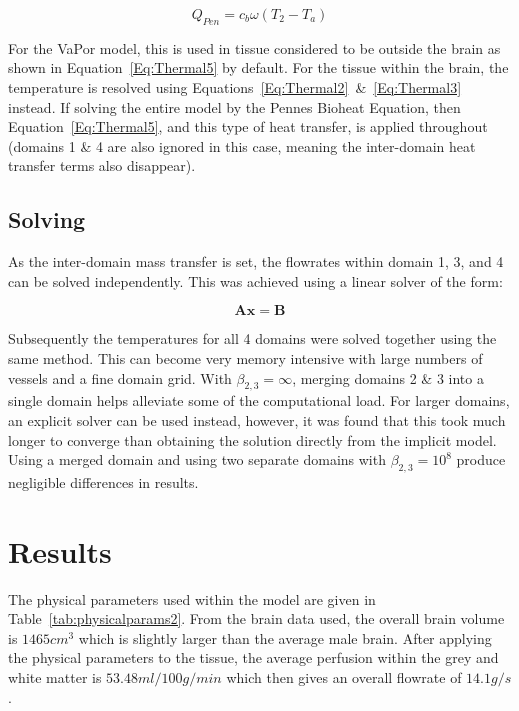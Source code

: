 \documentclass[11pt,english,a4paper,twoside,openright]{report}
\begin{document}
{{{{{{{{\begin{equation}
Q_{Pen} = c_{b}\omega(T_{2}-T_{a})
\end{equation}

For the VaPor model, this is used in tissue considered to be outside the brain as shown in Equation~\ref{Eq:Thermal5} by default. For the tissue within the brain, the temperature is resolved using Equations~\ref{Eq:Thermal2}~\&~\ref{Eq:Thermal3} instead. If solving the entire model by the Pennes Bioheat Equation, then Equation~\ref{Eq:Thermal5}, and this type of heat transfer, is applied throughout (domains 1 \& 4 are also ignored in this case, meaning the inter-domain heat transfer terms also disappear).

\subsection{Solving}

As the inter-domain mass transfer is set, the flowrates within domain 1, 3, and 4 can be solved independently. This was achieved using a linear solver of the form:

\begin{equation}
\mathbf{Ax}=\mathbf{B}
\label{Eq:LinearSolver}
\end{equation}

Subsequently the temperatures for all 4 domains were solved together using the same method. This can become very memory intensive with large numbers of vessels and a fine domain grid. With $\beta_{2,3} = \infty$, merging domains 2 \& 3 into a single domain helps alleviate some of the computational load. For larger domains, an explicit solver can be used instead, however, it was found that this took much longer to converge than obtaining the solution directly from the implicit model. Using a merged domain and using two separate domains with $\beta_{2,3}=10^{8}$ produce negligible differences in results.

\section[Results]{{\Large R}esults}
\label{Sec:3Results}

The physical parameters used within the model are given in Table~\ref{tab:physicalparams2}. From the brain data used, the overall brain volume is $1465cm^{3}$ which is slightly larger than the average male brain. After applying the physical parameters to the tissue, the average perfusion within the grey and white matter is $53.48ml/100g/min$ which then gives an overall flowrate of $14.1g/s$.

}}}}}}}}
\end{document}
